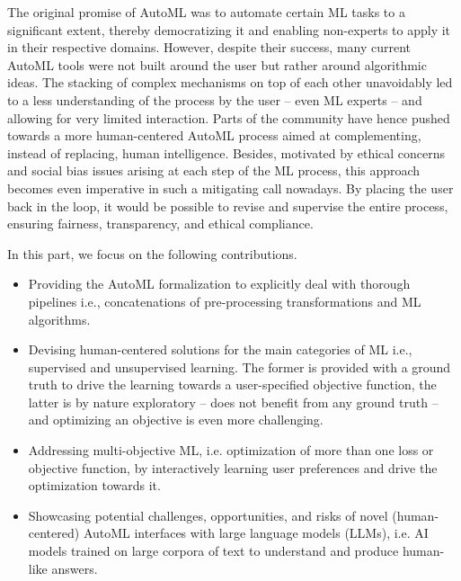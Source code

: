 \documentclass[a4paper,12pt,times,numbered,print,index]{Classes/PhDThesisPSnPDF}
\begin{document}
The original promise of AutoML was to automate certain ML tasks to a significant extent, thereby democratizing it and enabling non-experts to apply it in their respective domains.
However, despite their success, many current AutoML tools were not built around the user but rather around algorithmic ideas.
The stacking of complex mechanisms on top of each other unavoidably led to a less understanding of the process by the user -- even ML experts -- and allowing for very limited interaction.
Parts of the community have hence pushed towards a more human-centered AutoML process aimed at complementing, instead of replacing, human intelligence.
Besides, motivated by ethical concerns and social bias issues arising at each step of the ML process, this approach becomes even imperative in such a mitigating call nowadays.
By placing the user back in the loop, it would be possible to revise and supervise the entire process, ensuring fairness, transparency, and ethical compliance.

In this part, we focus on the following contributions.
\begin{itemize}
    \item Providing the AutoML formalization to explicitly deal with thorough pipelines i.e., concatenations of pre-processing transformations and ML algorithms.
    \item Devising human-centered solutions for the main categories of ML i.e., supervised and unsupervised learning. The former is provided with a ground truth to drive the learning towards a user-specified objective function, the latter is by nature exploratory -- does not benefit from any ground truth -- and optimizing an objective is even more challenging.
    \item Addressing multi-objective ML, i.e. optimization of more than one loss or objective function, by interactively learning user preferences and drive the optimization towards it.
    \item Showcasing potential challenges, opportunities, and risks of novel (human-centered) AutoML interfaces with large language models (LLMs), i.e. AI models trained on large corpora of text to understand and produce human-like answers.
\end{itemize}
\end{document}
